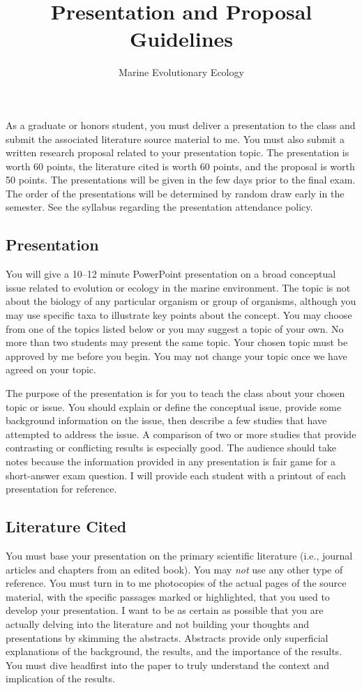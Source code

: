 \documentclass[11pt]{article}
\title{Presentation and Proposal Guidelines}
\author{Marine Evolutionary Ecology}
\date{}                                           %
\begin{document}
\maketitle
\thispagestyle{plain}

As a graduate or honors student, you must deliver a presentation to the class and submit the associated literature source material to me. You must also submit a written research proposal related to your presentation topic. The presentation is worth 60 points, the literature cited is worth 60 points, and the proposal is worth 50 points.  The presentations will be given in the few days prior to the final exam. The order of the presentations will be determined by random draw early in the semester. See the syllabus regarding the presentation attendance policy.  

\subsection*{Presentation}

You will give a 10--12 minute PowerPoint presentation on a broad conceptual issue related to evolution or ecology in the marine environment.  The topic is not about the biology of any particular organism or group of organisms, although you may use specific taxa to illustrate key points about the concept.  You may choose from one of the topics listed below or you may suggest a topic of your own.  No more than two students may present the same topic.  Your chosen topic must be approved by me before you begin.  You may not change your topic once we have agreed on your topic.  

The purpose of the presentation is for you to teach the class about your chosen topic or issue.  You should explain or define the conceptual issue, provide some background information on the issue, then describe a few studies that have attempted to address the issue.  A comparison of two or more studies that provide contrasting or conflicting results is especially good.  The audience should take notes because the information provided in any presentation is fair game for a short-answer exam question.  I will provide each student with a printout of each presentation for reference.

\subsection*{Literature Cited}

You must base your presentation on the primary scientific literature (i.e., journal articles and chapters from an edited book).  You may \emph{not} use any other type of reference.  You must turn in to me photocopies of the actual pages of the source material, with the specific passages marked or highlighted, that you used to develop your presentation.  I want to be as certain as possible that you are actually delving into the literature and not building your thoughts and presentations by skimming the abstracts.  Abstracts provide only superficial explanations of the background, the results, and the importance of the results.  You must dive headfirst into the paper to truly understand the context and implication of the results.  
\end{document}
